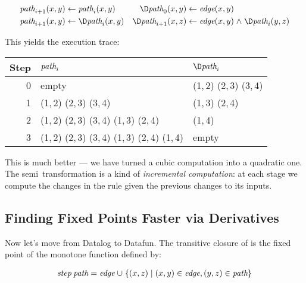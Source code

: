 \begin{align*}
  \name{path}_{i+1}(x,y) &\gets \name{path}_i(x,y)
  &
  \D\name{path}_0(x,y) &\gets \name{edge}(x,y)
  \\
  \name{path}_{i+1}(x,y) &\gets \D\name{path}_i(x,y)
  &
  \D\name{path}_{i+1}(x,z) &\gets \name{edge}(x,y) \wedge \D\name{path}_i(y,z)
\end{align*}

\noindent This yields the execution trace:

\begin{center}
  \setlength\tabcolsep{1em}
  \def\arraystretch{1.1}
  \begin{tabular}{@{}rll@{}}
    Step & $\text{\itshape path}_i$ & $\D\name{path}_i$
    \\\midrule
    0 & empty & (1,\,2) (2,\,3) (3,\,4)
    \\
    1 & (1,\,2) (2,\,3) (3,\,4) & (1,\,3) (2,\,4)
    \\
    2 & (1,\,2) (2,\,3) (3,\,4) (1,\,3) (2,\,4) & (1,\,4)
    \\
    3 & (1,\,2) (2,\,3) (3,\,4) (1,\,3) (2,\,4) (1,\,4) & empty
  \end{tabular}
\end{center}

This is much better --- we have turned a cubic computation into a quadratic one.
%
The semi\naive\ transformation is a kind of \emph{incremental computation}: at
each stage we compute the changes in the rule given the previous changes to its
inputs.
%


\subsection{Finding Fixed Points Faster via Derivatives}

Now let's move from Datalog to Datafun. The transitive closure of  is
the fixed point of the monotone function  defined by:

\nopagebreak[2]
\[\begin{array}{l}
  \name{step} \<\name{path} = \name{edge} \cup
  \setfor{(x,z)}{(x,y) \in \name{edge}, (y,z) \in \name{path}}
\end{array}\]

